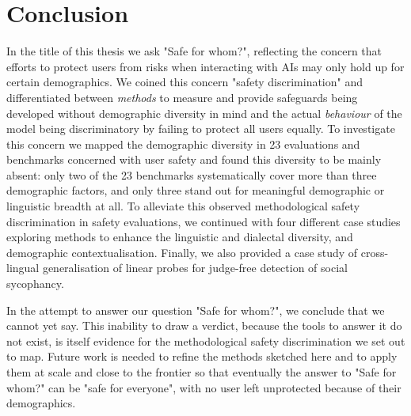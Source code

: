 \chapter{Conclusion}

In the title of this thesis we ask "Safe for whom?", reflecting the concern that efforts to protect users from risks when interacting with AIs may only hold up for certain demographics. We coined this concern "safety discrimination" and differentiated between \textit{methods} to measure and provide safeguards being developed without demographic diversity in mind and the actual \textit{behaviour} of the model being discriminatory by failing to protect all users equally. To investigate this concern we mapped the demographic diversity in 23 evaluations and benchmarks concerned with user safety and found this diversity to be mainly absent: only two of the 23 benchmarks systematically cover more than three demographic factors, and only three stand out for meaningful demographic or linguistic breadth at all. To alleviate this observed methodological safety discrimination in safety evaluations, we continued with four different case studies exploring methods to enhance the linguistic and dialectal diversity, and demographic contextualisation. Finally, we also provided a case study of cross-lingual generalisation of linear probes for judge-free detection of social sycophancy. 

In the attempt to answer our question "Safe for whom?", we conclude that we cannot yet say. This inability to draw a verdict, because the tools to answer it do not exist, is itself evidence for the methodological safety discrimination we set out to map. Future work is needed to refine the methods sketched here and to apply them at scale and close to the frontier so that eventually the answer to "Safe for whom?" can be "safe for everyone", with no user left unprotected because of their demographics.

